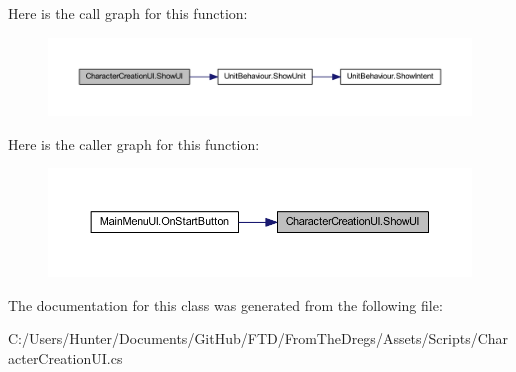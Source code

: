 Here is the call graph for this function\+:
\nopagebreak
\begin{figure}[H]
\begin{center}
\leavevmode
\includegraphics[width=350pt]{class_character_creation_u_i_a5e683c30d28a4c97d8f84de3de2062cd_cgraph}
\end{center}
\end{figure}
Here is the caller graph for this function\+:
\nopagebreak
\begin{figure}[H]
\begin{center}
\leavevmode
\includegraphics[width=350pt]{class_character_creation_u_i_a5e683c30d28a4c97d8f84de3de2062cd_icgraph}
\end{center}
\end{figure}


The documentation for this class was generated from the following file\+:\begin{DoxyCompactItemize}
\item 
C\+:/\+Users/\+Hunter/\+Documents/\+Git\+Hub/\+F\+T\+D/\+From\+The\+Dregs/\+Assets/\+Scripts/Character\+Creation\+U\+I.\+cs\end{DoxyCompactItemize}
